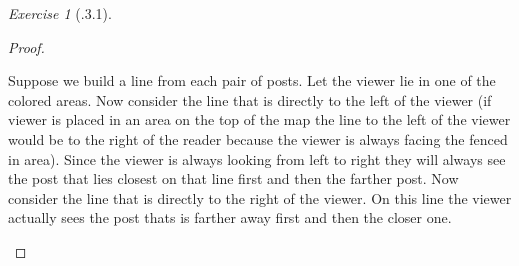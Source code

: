 \documentclass[12pt]{amsart}
\theoremstyle{remark}
\newtheorem*{exercise}{Exercise}%
\theoremstyle{mycomment}
\begin{document}
\begin{exercise}[\bigcirc.3.1]
\begin{proof}
\begin{enumerate}
Suppose we build a line from each pair of posts. Let the viewer lie in one of the colored areas. Now consider the line that is directly to the left of the viewer (if viewer is placed in an area on the top of the map the line to the left of the viewer would be to the right of the reader because the viewer is always facing the fenced in area). Since the viewer is always looking from left to right they will always see the post that lies closest on that line first and then the farther post. Now consider the line that is directly to the right of the viewer. On this line the viewer actually sees the post thats is farther away first and then the closer one. 




\end{enumerate}

\end{proof}
\end{exercise}
\end{document}
